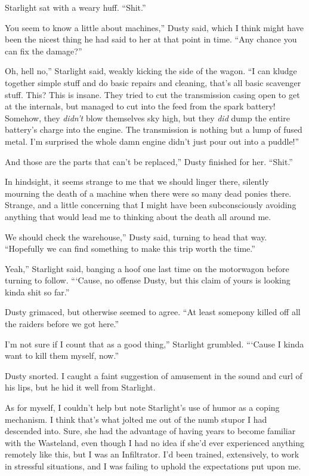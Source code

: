 Starlight sat with a weary huff. “Shit.”

\leavevmode{}You seem to know a little about machines,” Dusty said, which I think might have been the nicest thing he had said to her at that point in time. “Any chance you can fix the damage?”

\leavevmode{}Oh, hell no,” Starlight said, weakly kicking the side of the wagon. “I can kludge together simple stuff and do basic repairs and cleaning, that’s all basic scavenger stuff. This? This is insane. They tried to cut the transmission casing open to get at the internals, but managed to cut into the feed from the spark battery! Somehow, they \textit{didn’t} blow themselves sky high, but they \textit{did} dump the entire battery’s charge into the engine. The transmission is nothing but a lump of fused metal. I’m surprised the whole damn engine didn’t just pour out into a puddle!”

\leavevmode{}And those are the parts that can’t be replaced,” Dusty finished for her. “Shit.”

In hindsight, it seems strange to me that we should linger there, silently mourning the death of a machine when there were so many dead ponies there. Strange, and a little concerning that I might have been subconsciously avoiding anything that would lead me to thinking about the death all around me.

\leavevmode{}We should check the warehouse,” Dusty said, turning to head that way. “Hopefully we can find something to make this trip worth the time.”

\leavevmode{}Yeah,” Starlight said, banging a hoof one last time on the motorwagon before turning to follow. “‘Cause, no offense Dusty, but this claim of yours is looking kinda shit so far.”

Dusty grimaced, but otherwise seemed to agree. “At least somepony killed off all the raiders before we got here.”

\leavevmode{}I’m not sure if I count that as a good thing,” Starlight grumbled. “‘Cause I kinda want to kill them myself, now.”

Dusty snorted. I caught a faint suggestion of amusement in the sound and curl of his lips, but he hid it well from Starlight.

As for myself, I couldn’t help but note Starlight’s use of humor as a coping mechanism. I think that’s what jolted me out of the numb stupor I had descended into. Sure, she had the advantage of having years to become familiar with the Wasteland, even though I had no idea if she’d ever experienced anything remotely like this, but I was an Infiltrator. I’d been trained, extensively, to work in stressful situations, and I was failing to uphold the expectations put upon me.

